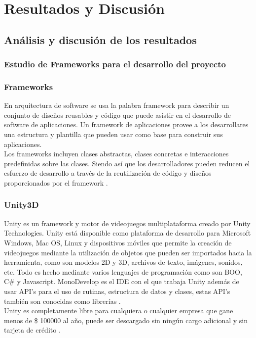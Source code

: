 \documentclass[a4paper, openright, 12pt]{report}
\begin{document}
\chapter{Resultados y Discusión}
\section{Análisis y discusión de los resultados}
\subsection{Estudio de Frameworks para el desarrollo del proyecto}\label{sec:estudioF}
\subsection*{Frameworks}
\justify
En arquitectura de software se usa la palabra framework para describir un conjunto de diseños reusables y código que puede asistir en el desarrollo de software de aplicaciones.
Un framework de aplicaciones provee a los desarrollares una estructura y plantilla que pueden usar como base para construir sus aplicaciones.\\
Los frameworks incluyen clases abstractas, clases concretas e interacciones predefinidas sobre las clases. Siendo así que los desarrolladores pueden reducen el esfuerzo de desarrollo a través de la reutilización de código y diseños proporcionados por el framework \cite{chen2004developing}.  

\subsection*{Unity3D}
\justify
Unity es un framework y motor de videojuegos multiplataforma creado por Unity Technologies. Unity está disponible como plataforma de desarrollo para Microsoft Windows, Mac OS, Linux y dispositivos móviles que permite la creación de videojuegos mediante la utilización de objetos que pueden ser importados hacia la herramienta, como son modelos 2D y 3D, archivos de texto, imágenes, sonidos, etc. Todo es hecho mediante varios lenguajes de programación como son BOO, C\# y Javascript. MonoDevelop es el IDE con el que trabaja Unity además de usar API's para el uso de rutinas, estructura de datos y clases, estas API's también son conocidas como librerías \cite{okita2014learning}.\\
Unity es completamente libre para cualquiera o cualquier empresa que gane menos de \$ 100000 al año, puede ser descargado sin ningún cargo adicional y sin tarjeta de crédito \cite{murray2014c}.
\end{document}
